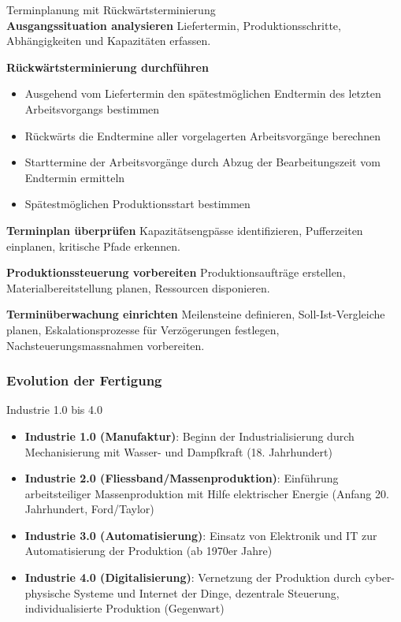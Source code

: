 \begin{KR}{Terminplanung mit Rückwärtsterminierung}\\
\textbf{Ausgangssituation analysieren}
Liefertermin, Produktionsschritte, Abhängigkeiten und Kapazitäten erfassen.

\textbf{Rückwärtsterminierung durchführen}
\begin{itemize}
    \item Ausgehend vom Liefertermin den spätestmöglichen Endtermin des letzten Arbeitsvorgangs bestimmen
    \item Rückwärts die Endtermine aller vorgelagerten Arbeitsvorgänge berechnen
    \item Starttermine der Arbeitsvorgänge durch Abzug der Bearbeitungszeit vom Endtermin ermitteln
    \item Spätestmöglichen Produktionsstart bestimmen
\end{itemize}

\textbf{Terminplan überprüfen}
Kapazitätsengpässe identifizieren, Pufferzeiten einplanen, kritische Pfade erkennen.

\textbf{Produktionssteuerung vorbereiten}
Produktionsaufträge erstellen, Materialbereitstellung planen, Ressourcen disponieren.

\textbf{Terminüberwachung einrichten}
Meilensteine definieren, Soll-Ist-Vergleiche planen, Eskalationsprozesse für Verzögerungen festlegen, Nachsteuerungsmassnahmen vorbereiten.

\end{KR}



\subsubsection{Evolution der Fertigung}

\begin{concept}{Industrie 1.0 bis 4.0}
\begin{itemize}
    \item \textbf{Industrie 1.0 (Manufaktur)}: Beginn der Industrialisierung durch Mechanisierung mit Wasser- und Dampfkraft (18. Jahrhundert)
    \item \textbf{Industrie 2.0 (Fliessband/Massenproduktion)}: Einführung arbeitsteiliger Massenproduktion mit Hilfe elektrischer Energie (Anfang 20. Jahrhundert, Ford/Taylor)
    \item \textbf{Industrie 3.0 (Automatisierung)}: Einsatz von Elektronik und IT zur Automatisierung der Produktion (ab 1970er Jahre)
    \item \textbf{Industrie 4.0 (Digitalisierung)}: Vernetzung der Produktion durch cyber-physische Systeme und Internet der Dinge, dezentrale Steuerung, individualisierte Produktion (Gegenwart)
\end{itemize}
\end{concept}

